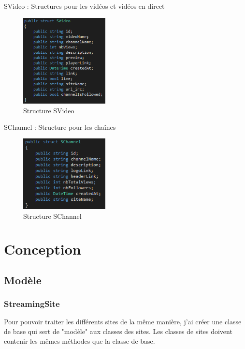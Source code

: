 \documentclass[11pt]{report} %
\begin{document}
			SVideo : Structures pour les vidéos et vidéos en direct
			
			\begin{figure}[h]
				\center
				\includegraphics[width=0.4\textwidth]{../img/SVideo.png}
				\caption{Structure SVideo}
				\label{SVideo}
			\end{figure}
			
			SChannel : Structure pour les chaînes
			
			\begin{figure}[h]
				\center
				\includegraphics[width=0.4\textwidth]{../img/SChannel.png}
				\caption{Structure SChannel}
				\label{SChanel}
			\end{figure}
			
	\newpage
	\section{Conception}
		\subsection{Modèle}
			\subsubsection{StreamingSite}
			Pour pouvoir traiter les différents sites de la même manière, j'ai créer une classe de base qui sert de "modèle" aux classes des sites.
			Les classes de sites doivent contenir les mêmes méthodes que la classe de base.
			
\end{document}
